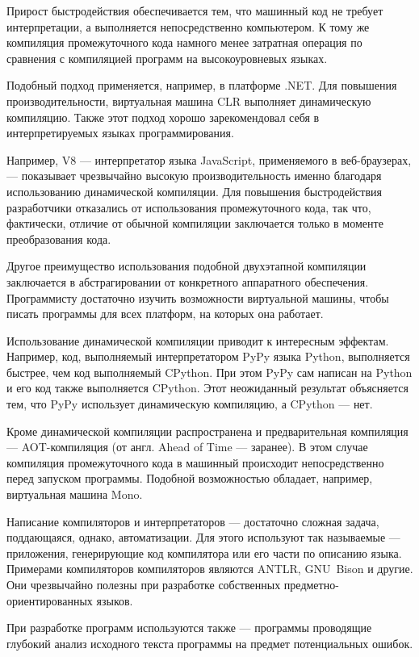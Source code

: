 Прирост быстродействия обеспечивается тем, что машинный код не требует
интерпретации, а выполняется непосредственно компьютером. К тому же
компиляция промежуточного кода намного менее затратная операция по
сравнения с компиляцией программ на высокоуровневых языках.

Подобный подход применяется, например, в платформе .NET. Для повышения
производительности, виртуальная машина CLR выполняет динамическую
компиляцию. Также этот подход хорошо зарекомендовал себя в
интерпретируемых языках программирования.

Например, V8 — интерпретатор языка JavaScript, применяемого в
веб-браузерах, — показывает чрезвычайно высокую производительность
именно благодаря использованию динамической компиляции. Для повышения
быстродействия разработчики отказались от использования промежуточного
кода, так что, фактически, отличие от обычной компиляции заключается
только в моменте преобразования кода.

Другое преимущество использования подобной двухэтапной компиляции
заключается в абстрагировании от конкретного аппаратного
обеспечения. Программисту достаточно изучить возможности виртуальной
машины, чтобы писать программы для всех платформ, на которых она
работает.

Использование динамической компиляции приводит к интересным эффектам.
Например, код, выполняемый интерпретатором PyPy языка Python,
выполняется быстрее, чем код выполняемый CPython. При этом PyPy сам
написан на Python и его код также выполняется CPython. Этот
неожиданный результат объясняется тем, что PyPy использует
динамическую компиляцию, а CPython — нет.

Кроме динамической компиляции распространена и предварительная
компиляция — AOT-компиляция (от англ. Ahead of Time — заранее). В этом
случае компиляция промежуточного кода в машинный происходит
непосредственно перед запуском программы. Подобной возможностью
обладает, например, виртуальная машина Mono.

Написание компиляторов и интерпретаторов — достаточно сложная задача,
поддающаяся, однако, автоматизации. Для этого используют так
называемые  —
приложения, генерирующие код компилятора или его части по описанию
языка. Примерами компиляторов компиляторов являются ANTLR, GNU~Bison и
другие. Они чрезвычайно полезны при разработке собственных
предметно-ориентированных языков.

При разработке программ используются также
 — программы
проводящие глубокий анализ исходного текста программы на предмет
потенциальных ошибок.

